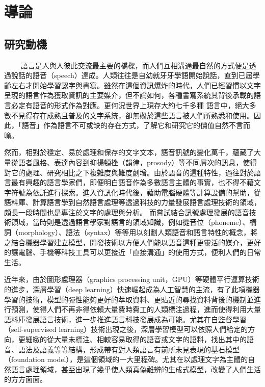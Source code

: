 \chapter{導論}
\section{研究動機}
　　
語言是人與人彼此交流最主要的橋樑，而人們互相溝通最自然的方式便是透過說話的語音（speech）達成。人類往往是自幼就牙牙學語開始說話，直到已屆學齡左右才開始學習認字與書寫。雖然在這個資訊爆炸的時代，人們已經習慣以文字呈現的語言作為獲取資訊的主要媒介，但不論如何，各種書寫系統其背後承載的語言必定有語音的形式作為對應。更何況世界上現存大約七千多種  \cite{ethnologue}  語言中，絕大多數不見得存在成熟且普及的文字系統，卻無礙於這些語言被人們所熟悉和使用。因此，「語音」作為語言不可或缺的存在方式，了解它和研究它的價值自然不言而喻。

然而，相對於穩定、易於處理和保存的文字文本，語音訊號的變化萬千，蘊藏了大量從語者風格、表達內容到抑揚頓挫（韻律，prosody）等不同層次的訊息，使得對它的處理、研究相比之下複雜度與難度劇增。由於語音的這種特性，過往對於語言最有興趣的語言學家們，即便明白語音作為多數語言主體的事實，也不得不藉文字符號為依託進行探索。進入資訊化時代後，藉助電腦硬體等計算設備的幫助，從語料庫、計算語言學到自然語言處理等透過科技的力量發展語言處理技術的領域，頗長一段時間也是專注於文字的處理與分析。
而嘗試結合訊號處理發展的語音技術領域，當時則是透過語言學家對語言的領域知識，例如從音位（phoneme）、構詞（morphology）、語法（syntax）等等用以刻劃人類語音和語言特性的概念，將之結合機器學習建立模型，開發技術以方便人們能以語音這種更靈活的媒介，更好的讓電腦、手機等科技工具可以更接近「直接溝通」的使用方式，便利人們的日常生活。

近年來，由於圖形處理器（graphics processing unit，GPU）等硬體平行運算技術的進步，深層學習（deep learning）快速崛起成為人工智慧的主流，有了此項機器學習的技術，模型的彈性能夠更好的萃取資料、更貼近的尋找資料背後的機制並進行預測，使得人們不再非得依賴大量費時費工的人類標注過程，進而使得利用大量語料庫發展語言技術，進一步推進語言科技發展成為可能。尤其在自監督學習（self-supervised learning）技術出現之後，深層學習模型可以依照人們給定的方向，更細緻的從大量未標注、相較容易取得的語音或文字的語料，找出其中的語音、語法及語義等等結構，形成帶有對人類語言有前所未見表現的基石模型（foundation model），是這個領域的一大里程碑。尤其在以處理文字為主體的自然語言處理領域，甚至出現了幾乎使人類真偽難辨的生成式模型，改變了人們生活的方方面面。

